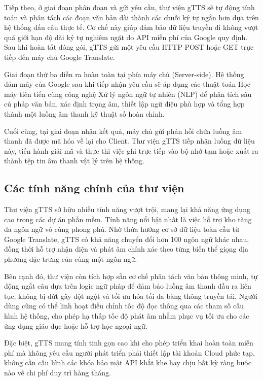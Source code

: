 Tiếp theo, ở giai đoạn phân đoạn và gửi yêu cầu, thư viện gTTS sẽ tự động tính toán và phân tách các đoạn văn bản dài thành các chuỗi ký tự ngắn hơn dựa trên hệ thống dấu câu thực tế. Cơ chế này giúp đảm bảo dữ liệu truyền đi không vượt quá giới hạn độ dài ký tự nghiêm ngặt do API miễn phí của Google quy định. Sau khi hoàn tất đóng gói, gTTS gửi một yêu cầu HTTP POST hoặc GET trực tiếp đến máy chủ Google Translate.

Giai đoạn thứ ba diễn ra hoàn toàn tại phía máy chủ (Server-side). Hệ thống đám mây của Google sau khi tiếp nhận yêu cầu sẽ áp dụng các thuật toán Học máy tiên tiến cùng công nghệ Xử lý ngôn ngữ tự nhiên (NLP) để phân tích sâu cú pháp văn bản, xác định trọng âm, thiết lập ngữ điệu phù hợp và tổng hợp thành một luồng âm thanh kỹ thuật số hoàn chỉnh. 

Cuối cùng, tại giai đoạn nhận kết quả, máy chủ gửi phản hồi chứa luồng âm thanh đã được mã hóa về lại cho Client. Thư viện gTTS tiếp nhận luồng dữ liệu này, tiến hành giải mã và thực thi việc ghi trực tiếp vào bộ nhớ tạm hoặc xuất ra thành tệp tin âm thanh vật lý trên hệ thống.

\subsection{Các tính năng chính của thư viện}
Thư viện gTTS sở hữu nhiều tính năng vượt trội, mang lại khả năng ứng dụng cao trong các dự án phần mềm. Tính năng nổi bật nhất là việc hỗ trợ kho tàng đa ngôn ngữ vô cùng phong phú. Nhờ thừa hưởng cơ sở dữ liệu toàn cầu từ Google Translate, gTTS có khả năng chuyển đổi hơn 100 ngôn ngữ khác nhau, đồng thời hỗ trợ nhận diện và phát âm chính xác theo từng biến thể giọng địa phương đặc trưng của cùng một ngôn ngữ. 

Bên cạnh đó, thư viện còn tích hợp sẵn cơ chế phân tách văn bản thông minh, tự động ngắt câu dựa trên logic ngữ pháp để đảm bảo luồng âm thanh đầu ra liên tục, không bị đứt gãy đột ngột và tối ưu hóa tối đa băng thông truyền tải. Người dùng cũng có thể linh hoạt điều chỉnh tốc độ đọc thông qua các tham số cấu hình hệ thống, cho phép hạ thấp tốc độ phát âm nhằm phục vụ tối ưu cho các ứng dụng giáo dục hoặc hỗ trợ học ngoại ngữ. 

Đặc biệt, gTTS mang tính tinh gọn cao khi cho phép triển khai hoàn toàn miễn phí mà không yêu cầu người phát triển phải thiết lập tài khoản Cloud phức tạp, không cần cấu hình các khóa bảo mật API khắt khe hay chịu bất kỳ ràng buộc nào về chi phí duy trì hàng tháng.
